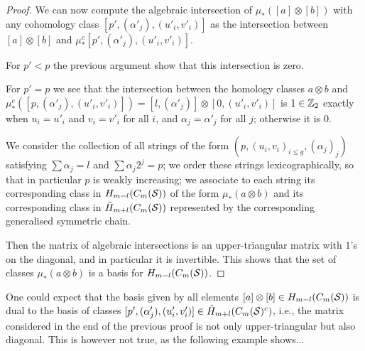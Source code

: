 \begin{proof}
We can now compute the algebraic intersection of $\mu_*([a]\otimes [b])$ with
any cohomology class $[p',(\alpha'_j),(u'_i,v'_i)]$ as the intersection between
$[a]\otimes [b]$ and $\mu^c_*[p',(\alpha'_j),(u'_i,v'_i)]$.

For $p'<p$ the previous argument show that this intersection is zero.

For $p'=p$ we see that the intersection between the homology classes
$a\otimes b$ and $\mu^c_*([p,(\alpha'_j),(u'_i,v'_i)])=[l,(\alpha'_j)]\otimes [0,(u'_i,v'_i)]$
is $1\in\mathbb{Z}_2$ exactly when $u_i=u'_i$ and $v_i=v'_i$ for all $i$, and $\alpha_j=\alpha'_j$
for all $j$; otherwise it is $0$.

We consider the collection of all strings of the form $(p,(u_i,v_i)_{i\leq g},(\alpha_j)_j)$
satisfying $\sum\alpha_j=l$ and $\sum \alpha_j2^j=p$; we order these strings lexicographically,
so that in particular $p$ is weakly increasing; we associate
to each string its corresponding class in $H_{m-l}(C_m(\mathcal{S}))$ of the form $\mu_*(a\otimes b)$ and its
corresponding class in $\tilde{H}_{m+l}(C_m(\mathcal{S}))$ represented by the corresponding generalised symmetric chain.

Then the matrix of algebraic intersections is an upper-triangular matrix
with $1$'s on the diagonal, and in particular
it is invertible. This shows that the set of classes $\mu_*(a\otimes b)$
is a basis for $H_{m-l}(C_m(\mathcal{S}))$.

% 
% 
% 
% 
% 
% 
% 
\end{proof}

One could expect that the basis given by all elements $[a]\otimes [b]\in H_{m-l}(C_m(\mathcal{S}))$
is dual to the basis of classes $[p',(\alpha'_j),(u'_i,v'_i)]\in \tilde{H}_{m+l}(C_m(\mathcal{S})^c)$, i.e., the
matrix considered in the end of the previous proof is not only upper-triangular but also
diagonal. This is however not true, as the following example shows...